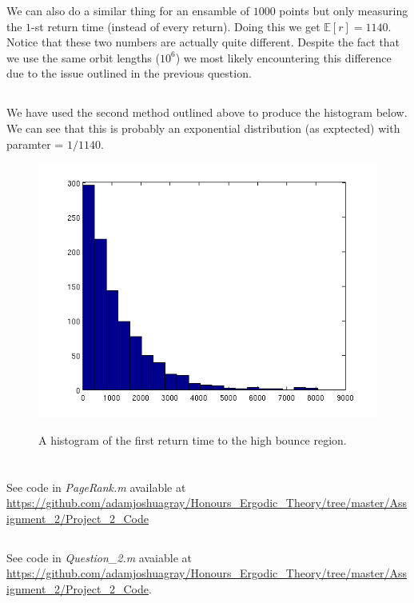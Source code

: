 \documentclass{unswmaths}
\begin{document}
We can also do a similar thing for an ensamble of $ 1000 $ points but only measuring the $1$-st return time (instead of every return). Doing this we get $ \mathbb{E}[r] = 1140 $. Notice that these two numbers are actually quite different. Despite the fact that we use the same orbit lengths ($10^6$) we most likely encountering this difference due to the issue outlined in the previous question.

\subsection{}
We have used the second method outlined above to produce the histogram below. We can see that this is probably an exponential distribution (as exptected) with paramter = $ 1 / 1140 $.
\begin{figure}[h]
    \includegraphics[scale=0.5]{Return_Histogram}
    \label{Histogram}
    \caption{A histogram of the first return time to the high bounce region. }
\end{figure}
\section{}
\subsection{}
See code in \emph{PageRank.m} available at \url{https://github.com/adamjoshuagray/Honours_Ergodic_Theory/tree/master/Assignment_2/Project_2_Code}

\subsection{}
See code in \emph{Question\_2.m} avaiable at \url{https://github.com/adamjoshuagray/Honours_Ergodic_Theory/tree/master/Assignment_2/Project_2_Code}. 
\end{document}
